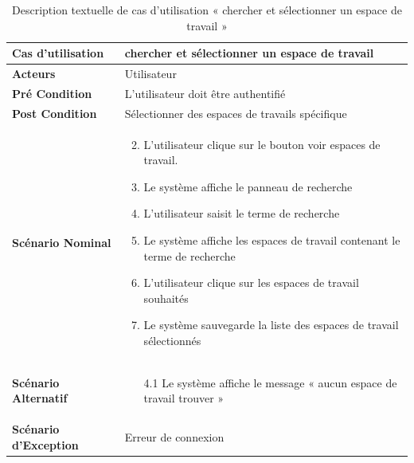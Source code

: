 \begin{longtable}{|p{5cm}|p{10cm}|}
  \caption{Description textuelle de cas d'utilisation « chercher et sélectionner un espace de travail   »} \label{tab:use_case_search_select_workspace} \\
\hline
\textbf{Cas d'utilisation}&chercher et sélectionner un espace de travail   \\
\hline
\textbf{Acteurs}&Utilisateur\\
\hline
\textbf{Pré Condition}&L'utilisateur doit être authentifié\\
\hline
\textbf{Post Condition}&Sélectionner des espaces de travails spécifique \\
\hline
\textbf{Scénario Nominal}&
\vspace{-\baselineskip}
\begin{enumerate}
  \setcounter{enumi}{1}
  \item L'utilisateur clique sur le bouton voir espaces de travail.
  \item Le système affiche le panneau de recherche
  \item L'utilisateur saisit le terme de recherche
  \item Le système affiche les espaces de travail contenant le terme de recherche
  \item L'utilisateur clique sur les espaces de travail souhaités
  \item Le système sauvegarde la liste des espaces de travail sélectionnés 
  
\end{enumerate}\\
\hline
\textbf{Scénario Alternatif}&
\vspace{-\baselineskip}
\begin{enumerate}
 \item [4.1] Le système affiche le message « aucun espace de travail trouver » 
\end{enumerate}\\
\hline
\textbf{Scénario d'Exception}&
Erreur de connexion\\
\hline

\end{longtable}



